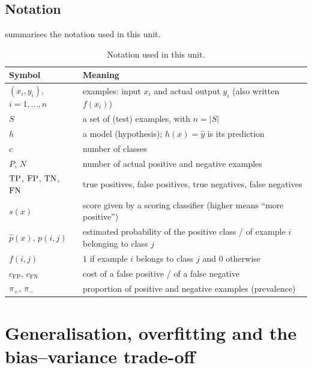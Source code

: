 \subsection{Notation}

 summarises the notation used in this unit.

\begin{table}[htbp]
\centering\small
\caption{Notation used in this unit.}\label{tab:notation}
\begin{tabularx}{\textwidth}{@{}lX@{}}
\toprule
Symbol & Meaning\\
\midrule
$(x_i,y_i)$, $i=1,\dots,n$ & examples: input $x_i$ and actual output $y_i$ (also written $f(x_i)$)\\
$S$ & a set of (test) examples, with $n=|S|$\\
$h$ & a model (hypothesis); $h(x)=\hat y$ is its prediction\\
$c$ & number of classes\\
$P$, $N$ & number of actual positive and negative examples\\
$\mathrm{TP}$, $\mathrm{FP}$, $\mathrm{TN}$, $\mathrm{FN}$ & true positives, false positives, true negatives, false negatives\\
$s(x)$ & score given by a scoring classifier (higher means ``more positive'')\\
$\hat p(x)$, $p(i,j)$ & estimated probability of the positive class / of example $i$ belonging to class $j$\\
$f(i,j)$ & $1$ if example $i$ belongs to class $j$ and $0$ otherwise\\
$c_{\mathrm{FP}}$, $c_{\mathrm{FN}}$ & cost of a false positive / of a false negative\\
$\pi_+$, $\pi_-$ & proportion of positive and negative examples (prevalence)\\
\bottomrule
\end{tabularx}
\end{table}

\section{Generalisation, overfitting and the bias--variance trade-off}\label{sec:biasvariance}

